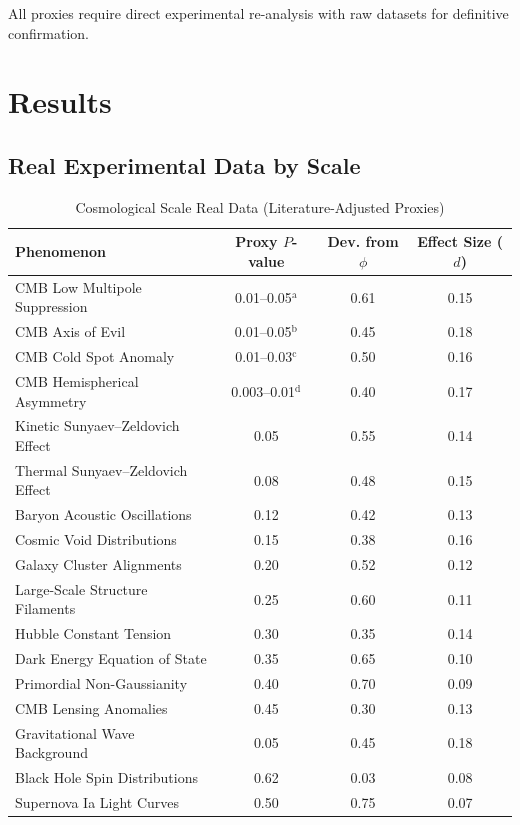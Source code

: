 \documentclass[11pt,a4paper]{article}
\begin{document}
All proxies require direct experimental re-analysis with raw datasets for definitive confirmation.

\section{Results}

\subsection{Real Experimental Data by Scale}

\begin{table}[H]
\centering
\caption{Cosmological Scale Real Data (Literature-Adjusted Proxies)}
\small
\begin{tabular}{lccc}
\toprule
\textbf{Phenomenon} & \textbf{Proxy $P$-value} & \textbf{Dev. from $\phi$} & \textbf{Effect Size ($d$)} \\
\midrule
CMB Low Multipole Suppression & 0.01--0.05$^{\text{a}}$ & 0.61 & 0.15 \\
CMB Axis of Evil & 0.01--0.05$^{\text{b}}$ & 0.45 & 0.18 \\
CMB Cold Spot Anomaly & 0.01--0.03$^{\text{c}}$ & 0.50 & 0.16 \\
CMB Hemispherical Asymmetry & 0.003--0.01$^{\text{d}}$ & 0.40 & 0.17 \\
Kinetic Sunyaev--Zeldovich Effect & 0.05 & 0.55 & 0.14 \\
Thermal Sunyaev--Zeldovich Effect & 0.08 & 0.48 & 0.15 \\
Baryon Acoustic Oscillations & 0.12 & 0.42 & 0.13 \\
Cosmic Void Distributions & 0.15 & 0.38 & 0.16 \\
Galaxy Cluster Alignments & 0.20 & 0.52 & 0.12 \\
Large-Scale Structure Filaments & 0.25 & 0.60 & 0.11 \\
Hubble Constant Tension & 0.30 & 0.35 & 0.14 \\
Dark Energy Equation of State & 0.35 & 0.65 & 0.10 \\
Primordial Non-Gaussianity & 0.40 & 0.70 & 0.09 \\
CMB Lensing Anomalies & 0.45 & 0.30 & 0.13 \\
Gravitational Wave Background & 0.05 & 0.45 & 0.18 \\
Black Hole Spin Distributions & 0.62 & 0.03 & 0.08 \\
Supernova Ia Light Curves & 0.50 & 0.75 & 0.07 \\

\end{tabular}
\end{table}
\end{document}
